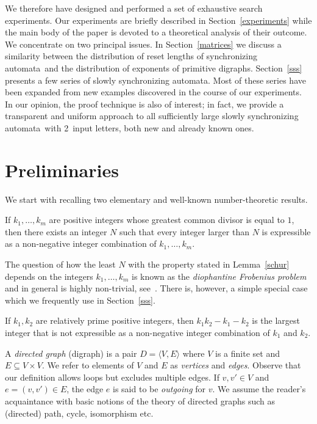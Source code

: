 \documentclass[11pt]{llncs}
\newcommand{\sa}{synchronizing automata}
\begin{document}
We therefore have designed and performed a set of exhaustive search
experiments. Our experiments are briefly described in Section~\ref{experiments}
while the main body of the paper is devoted to a theoretical analysis
of their outcome. We concentrate on two principal issues. In Section~\ref{matrices}
we discuss a similarity between the distribution of reset lengths of \sa\
and the distribution of exponents of primitive digraphs. Section~\ref{sss}
presents a few series of slowly \sa. Most of these series have been expanded
from new examples discovered in the course of our experiments. In our opinion,
the proof technique is also of interest; in fact, we provide a transparent
and uniform approach to all sufficiently large slowly \sa\ with 2~input letters,
both new and already known ones.

\section{Preliminaries}
\label{preliminaries}

We start with recalling two elementary and well-known number-theoretic results.
\begin{lemma}
\label{schur}
If $k_1,\dots,k_m$ are positive integers whose greatest common divisor is equal
to\/ $1$, then there exists an integer $N$ such that every integer larger than $N$
is expressible as a non-negative integer combination of $k_1,\dots,k_m$.
\end{lemma}
The question of how the least $N$ with the property stated in Lemma~\ref{schur}
depends on the integers $k_1,\dots,k_m$ is known as the \emph{diophantine Frobenius
problem} and in general is highly non-trivial, see~\cite{RaAl05}. There is, however,
a simple special case which we frequently use in Section~\ref{sss}.
\begin{lemma}
\label{sylvester}
If $k_1,k_2$ are relatively prime positive integers, then $k_1k_2-k_1-k_2$ is
the largest integer that is not expressible as a non-negative integer combination
of $k_1$ and $k_2$.
\end{lemma}

A \emph{directed graph} (digraph) is a pair $D=\langle V,E\rangle$ where $V$ is
a finite set and $E\subseteq V\times V$. We refer to elements of $V$ and $E$ as
\emph{vertices} and \emph{edges}. Observe that our definition allows loops but
excludes multiple edges. If $v,v'\in V$ and $e=(v,v')\in E$, the edge $e$ is said
to be \emph{outgoing} for $v$. We assume the reader's acquaintance with basic
notions of the theory of directed graphs such as (directed) path,
cycle, isomorphism etc.
\end{document}
